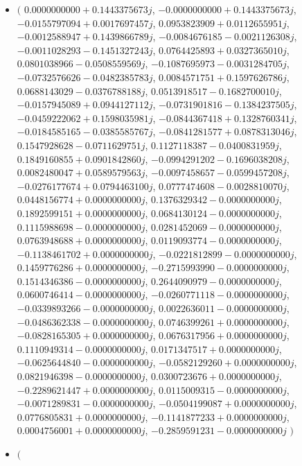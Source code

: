 \documentclass[14pt,a4paper]{article}
\begin{document}
\begin{itemize}
\item
$\big($
$0.0000000000+0.1443375673j$, $-0.0000000000+0.1443375673j$, $-0.0155797094+0.0017697457j$, $0.0953823909+0.0112655951j$, $-0.0012588947+0.1439866789j$, $-0.0084676185-0.0021126308j$, $-0.0011028293-0.1451327243j$, $0.0764425893+0.0327365010j$, $0.0801038966-0.0508559569j$, $-0.1087695973-0.0031284705j$, $-0.0732576626-0.0482385783j$, $0.0084571751+0.1597626786j$, $0.0688143029-0.0376788188j$, $0.0513918517-0.1682700010j$, $-0.0157945089+0.0944127112j$, $-0.0731901816-0.1384237505j$, $-0.0459222062+0.1598035981j$, $-0.0844367418+0.1328760341j$, $-0.0184585165-0.0385585767j$, $-0.0841281577+0.0878313046j$, $0.1547928628-0.0711629751j$, $0.1127118387-0.0400831959j$, $0.1849160855+0.0901842860j$, $-0.0994291202-0.1696038208j$, $0.0082480047+0.0589579563j$, $-0.0097458657-0.0599457208j$, $-0.0276177674+0.0794463100j$, $0.0777474608-0.0028810070j$, $0.0448156774+0.0000000000j$, $0.1376329342-0.0000000000j$, $0.1892599151+0.0000000000j$, $0.0684130124-0.0000000000j$, $0.1115988698-0.0000000000j$, $0.0281452069-0.0000000000j$, $0.0763948688+0.0000000000j$, $0.0119093774-0.0000000000j$, $-0.1138461702+0.0000000000j$, $-0.0221812899-0.0000000000j$, $0.1459776286+0.0000000000j$, $-0.2715993990-0.0000000000j$, $0.1514346386-0.0000000000j$, $0.2644090979-0.0000000000j$, $0.0600746414-0.0000000000j$, $-0.0260771118-0.0000000000j$, $-0.0339893266-0.0000000000j$, $0.0022636011-0.0000000000j$, $-0.0486362338-0.0000000000j$, $0.0746399261+0.0000000000j$, $-0.0828165305+0.0000000000j$, $0.0676317956+0.0000000000j$, $0.1110949314-0.0000000000j$, $0.0171347517+0.0000000000j$, $-0.0625644840-0.0000000000j$, $-0.0582129260+0.0000000000j$, $0.0821946398-0.0000000000j$, $0.0300723676+0.0000000000j$, $-0.2289621447+0.0000000000j$, $0.0115009315-0.0000000000j$, $-0.0071289831-0.0000000000j$, $-0.0504199087+0.0000000000j$, $0.0776805831+0.0000000000j$, $-0.1141877233+0.0000000000j$, $0.0004756001+0.0000000000j$, $-0.2859591231-0.0000000000j$
$\big)$
\item
$\big($

\end{itemize}
\end{document}
